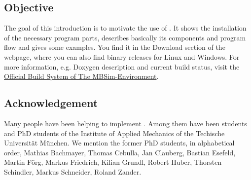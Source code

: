 \subsection{Objective}
The goal of this introduction is to motivate the use of \MBSim{}. It shows the installation of the necessary program parts, describes basically its components and program flow and gives some examples. You find it in the Download section of the \MBSim{} webpage, where you can also find binary releases for Linux and Windows. For more information, e.g. Doxygen description and current build status, visit the {\href{http://h2508405.stratoserver.net/mbsim/}{\textsf{Official Build System of The MBSim-Environment}}}.
%
\subsection{Acknowledgement}
Many people have been helping to implement \MBSim{}. Among them have been students and PhD students of the Institute of Applied Mechanics of the Techische Universit\"at M\"unchen. We mention the former PhD students, in alphabetical order, Mathias Bachmayer, Thomas Cebulla, Jan Clauberg, Bastian Esefeld, Martin F\"org, Markus Friedrich, Kilian Grundl, Robert Huber, Thorsten Schindler, Markus Schneider, Roland Zander. 

